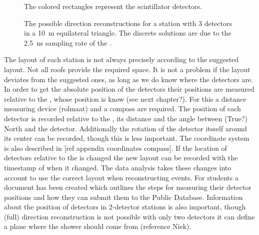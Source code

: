 \begin{figure}
    \centering
    
    \caption{ The colored
             rectangles represent the scintillator detectors.}
    \label{fig:4_detector_station}
\end{figure}

\begin{figure}
    \centering
    
    \caption{ The possible
             direction reconstructions for a station with 3 detectors in
             a \SI{10}{\meter} equilateral triangle. The discrete
             solutions are due to the \SI{2.5}{\ns} sampling
             rate of the \adcs.}
    \label{fig:discrete_directions}
\end{figure}

The layout of each station is not always precisely according to the suggested layout. Not all roofs provide the required space. It is not a problem if the layout deviates from the suggested ones, as long as we do know where the detectors are. In order to get the absolute position of the detectors their positions are measured relative to the \gps, whose position is know (see next chapter?). For this a distance measuring device (rolmaat) and a compass are required. The position of each detector is recorded relative to the \gps, its distance and the angle between (True?) North and the detector. Additionally the rotation of the detector itsself around its center can be recorded, though this is less important. The coordinate system is also described in [ref appendix coordinates compass]. If the location of detectors relative to the \gps is changed the new layout can be recorded with the timestamp of when it changed. The data analysis takes these changes into account to use the correct layout when reconstructing events. For students a document has been created which outlines the steps for measuring their detector positions and how they can submit them to the Public Database. Information about the position of detectors in 2-detector stations is also important, though (full) direction reconstruction is not possible with only two detectors it can define a plane where the shower should come from (reference Niek).
